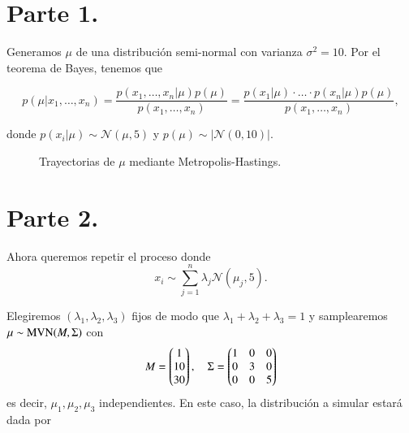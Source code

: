 \documentclass[
	spanish, %
	letterpaper, oneside
]{article}
\begin{document}
\templatePortrait

\templatePagecfg



\templateFinalcfg


\section*{Parte 1.}
Generamos $\mu$ de una distribución semi-normal con varianza $\sigma^2=10$. Por el teorema de Bayes, tenemos que

$$p(\mu|x_1,\ldots,x_n)=\frac{p(x_1,\ldots,x_n|\mu)p(\mu)}{p(x_1,\ldots,x_n)}=\frac{p(x_1|\mu)\cdot\ldots\cdot p(x_n|\mu)p(\mu)}{p(x_1,\ldots,x_n)},$$

donde $p(x_i|\mu)\sim\mathcal N(\mu,5)$ y $p(\mu)\sim|\mathcal N(0,10)|$.
	
\begin{figure}[H]
	\caption{Trayectorias de \(\mu\) mediante Metropolis-Hastings.}
\end{figure}

\section*{Parte 2.}
Ahora queremos repetir el proceso donde $$x_i\sim\sum_{j=1}^n\lambda_j\mathcal N(\mu_j,5).$$

Elegiremos $(\lambda_1,\lambda_2,\lambda_3)$ fijos de modo que $\lambda_1+\lambda_2+\lambda_3=1$ y samplearemos $\mu\sim\text{MVN}(M,\Sigma)$ con
\[M=\begin{pmatrix}
	1\\10\\30
\end{pmatrix},\quad\Sigma=\begin{pmatrix}
1&0&0\\0&3&0\\0&0&5
\end{pmatrix}\]
es decir, $\mu_1,\mu_2,\mu_3$ independientes. En este caso, la distribución a simular estará dada por
\end{document}
